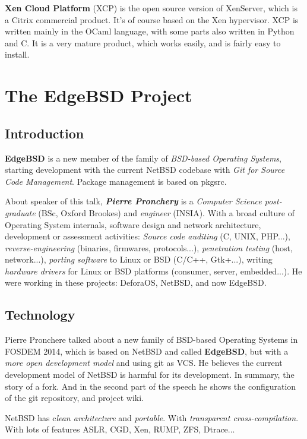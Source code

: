 \documentclass[11pt]{article}
\begin{document}
\textbf{Xen Cloud Platform }(XCP) is the open source version of XenServer, which is a Citrix commercial product. It's of course based on the Xen hypervisor. XCP is written mainly in the OCaml language, with some parts also written in Python and C. It is a very mature product, which works easily, and is fairly easy to install. 

\newpage

\section{The EdgeBSD Project}

\subsection{Introduction}
\textbf{EdgeBSD} is a new member of the family of \emph{BSD-based Operating Systems}, starting development with the current NetBSD codebase with \emph{Git for Source Code Management}. Package management is based on pkgsrc.

About speaker of this talk, \emph{\textbf{Pierre Pronchery}} is a \emph{Computer Science post-graduate} (BSc, Oxford Brookes) and \emph{engineer} (INSIA). With a broad culture of Operating System internals, software design and network architecture, development or assessment activities: \emph{Source code auditing }(C, UNIX, PHP...), \emph{reverse-engineering} (binaries, firmwares, protocols...), \emph{penetration testing} (host, network...), \emph{porting software} to Linux or BSD (C/C++, Gtk+...), writing \emph{hardware drivers} for Linux or BSD platforms (consumer, server, embedded...). He were working in these projects: DeforaOS, NetBSD, and now EdgeBSD.
\subsection{Technology}

Pierre Pronchere talked about a new family of BSD-based Operating Systems in FOSDEM 2014, which is based on NetBSD and called \textbf{EdgeBSD}, but with a \emph{more open development model} and using git as VCS. He believes the current development model of NetBSD is harmful for its development. In summary, the story of a fork. And in the second part of the speech he shows the configuration of the git repository, and project wiki.

NetBSD has c\emph{lean architecture} and \emph{portable}. With \emph{transparent cross-compilation}. With lots of features ASLR, CGD, Xen, RUMP, ZFS, Dtrace...
\end{document}
